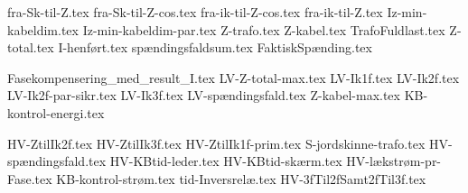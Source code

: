 \usepackage[utf8]{inputenc}%
\usepackage{amsmath}%
\usepackage{mathtools}%
\usepackage{icomma}%
\usepackage{siunitx}%
\usepackage{fp}%
\usepackage{xstring}%
\usepackage{listofitems}
\usepackage{ifthen}
\usepackage{gensymb} %

{fra-Sk-til-Z.tex}
{fra-Sk-til-Z-cos.tex}
{fra-ik-til-Z-cos.tex}
{fra-ik-til-Z.tex}
{Iz-min-kabeldim.tex}
{Iz-min-kabeldim-par.tex}
{Z-trafo.tex}
{Z-kabel.tex}
{TrafoFuldlast.tex}
{Z-total.tex}
{I-henført.tex}
{spændingsfaldsum.tex}
{FaktiskSpænding.tex}

{Fasekompensering_med_result_I.tex}
{LV-Z-total-max.tex}
{LV-Ik1f.tex}
{LV-Ik2f.tex}
{LV-Ik2f-par-sikr.tex}
{LV-Ik3f.tex}
{LV-spændingsfald.tex}
{Z-kabel-max.tex}
{KB-kontrol-energi.tex}

{HV-ZtilIk2f.tex}
{HV-ZtilIk3f.tex}
{HV-ZtilIk1f-prim.tex}
{S-jordskinne-trafo.tex}
{HV-spændingsfald.tex}
{HV-KBtid-leder.tex}
{HV-KBtid-skærm.tex}
{HV-lækstrøm-pr-Fase.tex}
{KB-kontrol-strøm.tex}
{tid-Inversrelæ.tex}
{HV-3fTil2fSamt2fTil3f.tex}